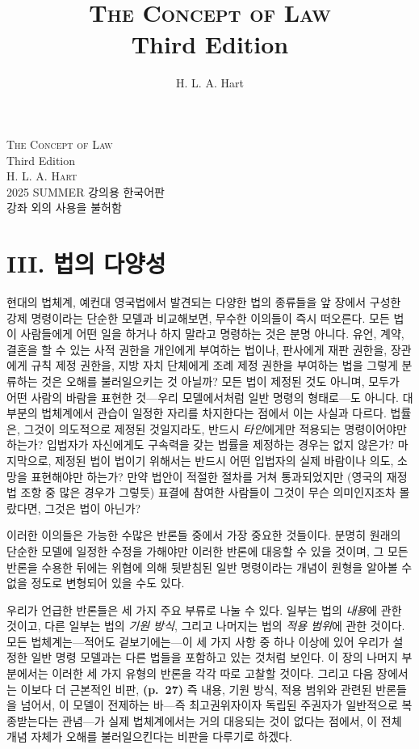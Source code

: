 \documentclass[12pt, oneside]{book}  %
\title{\Huge\textsc{The Concept of Law} \\[2ex] \Large Third Edition}
\author{\Large H. L. A. Hart}
\date{}
\begin{document}
\begin{titlepage}
  \centering
  \vspace*{3cm}
  {\Huge\textsc{The Concept of Law}}\\[1.5ex]
  {\Large Third Edition}\\[4ex]
  \textsc{H. L. A. Hart}\\[6ex]
  {\small 2025 SUMMER 강의용 한국어판\\
  강좌 외의 사용을 불허함}
  \vfill
\end{titlepage}

\section{\texorpdfstring{\textbf{III. 법의
다양성}}{III. 법의 다양성}}\label{iii.-uxbc95uxc758-uxb2e4uxc591uxc131}

현대의 법체계, 예컨대 영국법에서 발견되는 다양한 법의 종류들을 앞 장에서
구성한 강제 명령이라는 단순한 모델과 비교해보면, 무수한 이의들이 즉시
떠오른다. 모든 법이 사람들에게 어떤 일을 하거나 하지 말라고 명령하는
것은 분명 아니다. 유언, 계약, 결혼을 할 수 있는 사적 권한을 개인에게
부여하는 법이나, 판사에게 재판 권한을, 장관에게 규칙 제정 권한을, 지방
자치 단체에게 조례 제정 권한을 부여하는 법을 그렇게 분류하는 것은 오해를
불러일으키는 것 아닐까? 모든 법이 제정된 것도 아니며, 모두가 어떤 사람의
바람을 표현한 것---우리 모델에서처럼 일반 명령의 형태로---도 아니다.
대부분의 법체계에서 관습이 일정한 자리를 차지한다는 점에서 이는 사실과
다르다. 법률은, 그것이 의도적으로 제정된 것일지라도, 반드시
\emph{타인}에게만 적용되는 명령이어야만 하는가? 입법자가 자신에게도
구속력을 갖는 법률을 제정하는 경우는 없지 않은가? 마지막으로, 제정된
법이 법이기 위해서는 반드시 어떤 입법자의 실제 바람이나 의도, 소망을
표현해야만 하는가? 만약 법안이 적절한 절차를 거쳐 통과되었지만 (영국의
재정법 조항 중 많은 경우가 그렇듯) 표결에 참여한 사람들이 그것이 무슨
의미인지조차 몰랐다면, 그것은 법이 아닌가?

이러한 이의들은 가능한 수많은 반론들 중에서 가장 중요한 것들이다. 분명히
원래의 단순한 모델에 일정한 수정을 가해야만 이러한 반론에 대응할 수 있을
것이며, 그 모든 반론을 수용한 뒤에는 위협에 의해 뒷받침된 일반
명령이라는 개념이 원형을 알아볼 수 없을 정도로 변형되어 있을 수도 있다.

우리가 언급한 반론들은 세 가지 주요 부류로 나눌 수 있다. 일부는 법의
\emph{내용}에 관한 것이고, 다른 일부는 법의 \emph{기원 방식}, 그리고
나머지는 법의 \emph{적용 범위}에 관한 것이다. 모든 법체계는---적어도
겉보기에는---이 세 가지 사항 중 하나 이상에 있어 우리가 설정한 일반 명령
모델과는 다른 법들을 포함하고 있는 것처럼 보인다. 이 장의 나머지
부분에서는 이러한 세 가지 유형의 반론을 각각 따로 고찰할 것이다. 그리고
다음 장에서는 이보다 더 근본적인 비판, \textbf{(p.~27)} 즉 내용, 기원
방식, 적용 범위와 관련된 반론들을 넘어서, 이 모델이 전제하는 바---즉
최고권위자이자 독립된 주권자가 일반적으로 복종받는다는 관념---가 실제
법체계에서는 거의 대응되는 것이 없다는 점에서, 이 전체 개념 자체가
오해를 불러일으킨다는 비판을 다루기로 하겠다.
\end{document}
